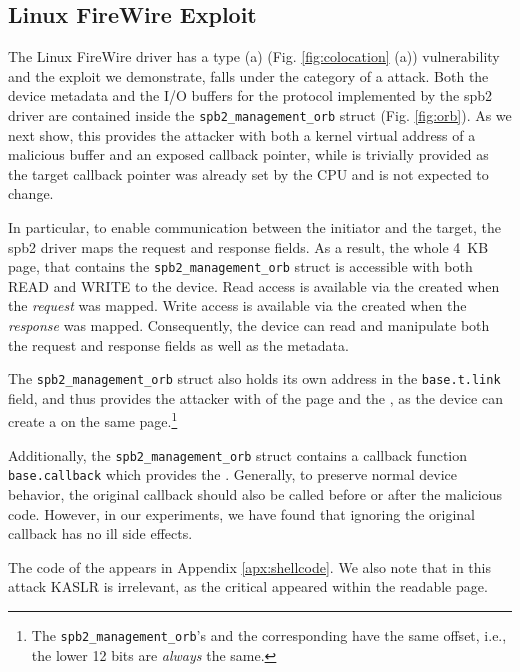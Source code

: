 \subsection{Linux FireWire Exploit} \label{sec:sbp2_attack}

The Linux FireWire driver has a type (a) (Fig. \ref{fig:colocation} (a)) \subpage{} vulnerability and the exploit we demonstrate, falls under the category of a \simple{} attack. Both the device metadata and the I/O buffers for the \spb{} protocol implemented by the spb2 driver are contained inside the \texttt{spb2\_management\_orb} struct (Fig. \ref{fig:orb}). As we next show, this provides the attacker with both a kernel virtual address of a malicious buffer and an exposed callback pointer, while \oportunity is trivially provided as the target callback pointer was already set by the CPU and is not expected to change.

In particular, to enable communication between the initiator and the target, the spb2 driver maps the request and response fields. As a result, the whole 4~KB page, that contains the \texttt{spb2\_management\_orb} struct is accessible with both READ and WRITE to the device. Read access is available via the \iova{} created when the \emph{request} was mapped. Write access is available via the \iova{} created when the \emph{response} was mapped. Consequently, the device can read and manipulate both the request and response fields as well as the metadata. 

The \texttt{spb2\_management\_orb} struct also holds its own address in the \texttt{base.t.link} field, and thus provides the attacker with \kva of the page and the \motivation, as the device can create a \mabaf on the same page.\footnote{The \texttt{spb2\_management\_orb}'s \kva and the corresponding \iova{} have the same offset, i.e., the lower 12 bits are \emph{always} the same.}


Additionally, the \texttt{spb2\_management\_orb} struct contains a callback function \texttt{base.callback} which provides the \means. Generally, to preserve normal device behavior, the original callback should also be called before or after the malicious code. However, in our experiments, we have found that ignoring the original callback has no ill side effects. 



The code of the \mabaf{} appears in Appendix \ref{apx:shellcode}. We also note that in this attack KASLR is irrelevant, as the critical \kva{} appeared within the readable page.

